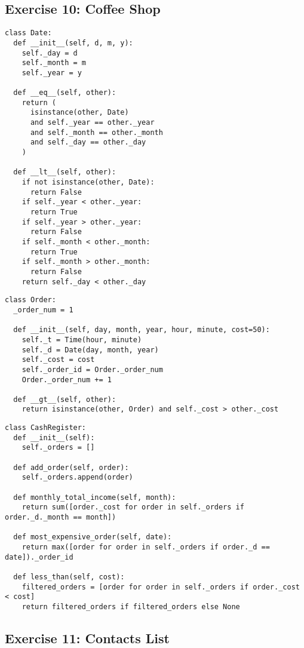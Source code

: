 \documentclass[11pt]{article}
\begin{document}
\subsection{Exercise 10: Coffee Shop}
\begin{lstlisting}
class Date:
  def __init__(self, d, m, y):
    self._day = d
    self._month = m
    self._year = y

  def __eq__(self, other):
    return (
      isinstance(other, Date)
      and self._year == other._year
      and self._month == other._month
      and self._day == other._day
    )

  def __lt__(self, other):
    if not isinstance(other, Date):
      return False
    if self._year < other._year:
      return True
    if self._year > other._year:
      return False
    if self._month < other._month:
      return True
    if self._month > other._month:
      return False
    return self._day < other._day
\end{lstlisting}

\begin{lstlisting}
class Order:
  _order_num = 1

  def __init__(self, day, month, year, hour, minute, cost=50):
    self._t = Time(hour, minute)
    self._d = Date(day, month, year)
    self._cost = cost
    self._order_id = Order._order_num
    Order._order_num += 1

  def __gt__(self, other):
    return isinstance(other, Order) and self._cost > other._cost
\end{lstlisting}

\begin{lstlisting}
class CashRegister:
  def __init__(self):
    self._orders = []

  def add_order(self, order):
    self._orders.append(order)

  def monthly_total_income(self, month):
    return sum([order._cost for order in self._orders if order._d._month == month])

  def most_expensive_order(self, date):
    return max([order for order in self._orders if order._d == date])._order_id

  def less_than(self, cost):
    filtered_orders = [order for order in self._orders if order._cost < cost]
    return filtered_orders if filtered_orders else None
\end{lstlisting}

\subsection{Exercise 11: Contacts List}
\end{document}
